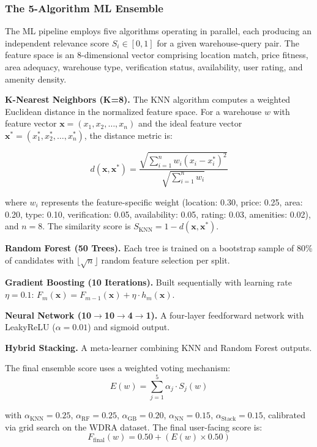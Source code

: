 \documentclass[conference]{IEEEtran}
\begin{document}
\subsubsection{The 5-Algorithm ML Ensemble}
The ML pipeline employs five algorithms operating in parallel, each producing an independent relevance score $S_i \in [0, 1]$ for a given warehouse-query pair. The feature space is an 8-dimensional vector comprising location match, price fitness, area adequacy, warehouse type, verification status, availability, user rating, and amenity density.

\textbf{K-Nearest Neighbors (K=8).} The KNN algorithm computes a weighted Euclidean distance in the normalized feature space. For a warehouse $w$ with feature vector $\mathbf{x} = (x_1, x_2, \ldots, x_n)$ and the ideal feature vector $\mathbf{x}^* = (x_1^*, x_2^*, \ldots, x_n^*)$, the distance metric is:

\begin{equation}
d(\mathbf{x}, \mathbf{x}^*) = \frac{\sqrt{\sum_{i=1}^{n} w_i \left(x_i - x_i^*\right)^2}}{\sqrt{\sum_{i=1}^{n} w_i}}
\label{eq:knn}
\end{equation}

\noindent where $w_i$ represents the feature-specific weight (location: 0.30, price: 0.25, area: 0.20, type: 0.10, verification: 0.05, availability: 0.05, rating: 0.03, amenities: 0.02), and $n = 8$. The similarity score is $S_{\text{KNN}} = 1 - d(\mathbf{x}, \mathbf{x}^*)$.

\textbf{Random Forest (50 Trees).} Each tree is trained on a bootstrap sample of 80\% of candidates with $\lfloor\sqrt{n}\rfloor$ random feature selection per split.

\textbf{Gradient Boosting (10 Iterations).} Built sequentially with learning rate $\eta = 0.1$:
$F_m(\mathbf{x}) = F_{m-1}(\mathbf{x}) + \eta \cdot h_m(\mathbf{x})$.

\textbf{Neural Network (10$\rightarrow$10$\rightarrow$4$\rightarrow$1).} A four-layer feedforward network with LeakyReLU ($\alpha = 0.01$) and sigmoid output.

\textbf{Hybrid Stacking.} A meta-learner combining KNN and Random Forest outputs.

The final ensemble score uses a weighted voting mechanism:
\begin{equation}
E(w) = \sum_{j=1}^{5} \alpha_j \cdot S_j(w)
\label{eq:ensemble}
\end{equation}

\noindent with $\alpha_{\text{KNN}} = 0.25$, $\alpha_{\text{RF}} = 0.25$, $\alpha_{\text{GB}} = 0.20$, $\alpha_{\text{NN}} = 0.15$, $\alpha_{\text{Stack}} = 0.15$, calibrated via grid search on the WDRA dataset. The final user-facing score is:
\begin{equation}
F_{\text{final}}(w) = 0.50 + \left(E(w) \times 0.50\right)
\label{eq:final}
\end{equation}
\end{document}
